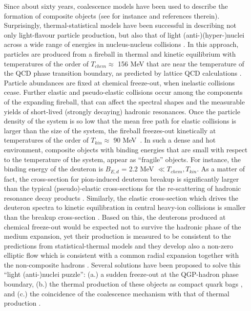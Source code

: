 Since about sixty years, coalescence models have been used to describe the formation of composite objects (see for instance \cite{Butler:1963, Kapusta:1980, Sato:1981ez, Nagle:1996vp, Scheibl:1998tk, Cho:2017dcy, Blum:2017qnn, Bazak:2018hgl, Zhao:2018lyf} and references therein).
Surprisingly, thermal-statistical models have been successful in describing not only light-flavour particle production, but also that of light (anti-)(hyper-)nuclei across a wide range of energies in nucleus-nucleus collisions \cite{Andronic:2017, Andronic:2010qu}. 
In this approach, particles are produced from a fireball in thermal and kinetic equilibrium with temperatures of the order of $T_{chem} \approx$ 156 MeV that are near the temperature of the QCD phase transition boundary, as predicted by lattice QCD calculations \cite{Bazavov:2014pvz,Bellwied:2013cta}. Particle abundances are fixed at chemical freeze-out, when inelastic collisions cease. Further elastic and pseudo-elastic collisions occur among the components of the expanding fireball, that can affect the spectral shapes and the measurable yields of short-lived (strongly decaying) hadronic resonances. Once the particle density of the system is so low that the mean free path for elastic collisions is larger than the size of the system, the fireball freezes-out kinetically at temperatures of the order of $T_{kin} \approx$ 90 MeV~\cite{Abelev:2013vea}. 
In such a dense and hot environment, composite objects with binding energies that are small with respect to the temperature of the system, appear as ``fragile'' objects. For instance, the binding energy of the deuteron is $B_{E, d}$ = 2.2 MeV $\ll T_{chem}, T_{kin}$.
As a matter of fact, the cross-section for pion-induced deuteron breakup is significantly larger than the typical (pseudo)-elastic cross-sections for the re-scattering of hadronic resonance decay products \cite{Garcilazo:1982yc, Bass:1998ca, Schukraft:2017nbn}. 
Similarly, the elastic cross-section which drives the deuteron spectra to kinetic equilibration in central heavy-ion collisions \cite{Acharya:2017dmc} is smaller than the breakup cross-section \cite{Garcilazo:1982yc, Bass:1998ca, Schukraft:2017nbn}.   
Based on this, the deuterons produced at chemical freeze-out would be expected not to survive the hadronic phase of the medium expansion, yet their production is measured to be consistent to the predictions from statistical-thermal models and they develop also a non-zero elliptic flow which is consistent with a common radial expansion together with the non-composite hadrons \cite{Acharya:2017dmc}. 
Several solutions have been proposed to solve this ``light (anti-)nuclei puzzle'': (a.) a sudden freeze-out at the QGP-hadron phase boundary, (b.) the thermal production of these objects as compact quark bags \cite{Andronic:2017}, and (c.) the coincidence of the coalescence mechanism with that of thermal production \cite{Scheibl:1998tk, HeinzTorino}. 
